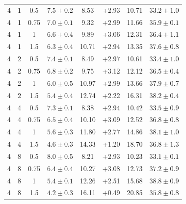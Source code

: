 \documentclass{article}
\begin{document}
\begin{table}[!htbp]
\begin{tabular}{cccccccc}
4 & 1 & 0.5 & $7.5\pm0.2$ & 8.53 & +2.93 & 10.71 & $33.2\pm1.0$\\
4 & 1 & 0.75 & $7.0\pm0.1$ & 9.32 & +2.99 & 11.66 & $35.9\pm0.1$\\
4 & 1 & 1 & $6.6\pm0.4$ & 9.89 & +3.06 & 12.31 & $36.4\pm1.1$\\
4 & 1 & 1.5 & $6.3\pm0.4$ & 10.71 & +2.94 & 13.35 & $37.6\pm0.8$\\
4 & 2 & 0.5 & $7.4\pm0.1$ & 8.49 & +2.97 & 10.61 & $33.4\pm1.0$\\
4 & 2 & 0.75 & $6.8\pm0.2$ & 9.75 & +3.12 & 12.12 & $36.5\pm0.4$\\
4 & 2 & 1 & $6.0\pm0.5$ & 10.97 & +2.99 & 13.66 & $37.9\pm0.7$\\
4 & 2 & 1.5 & $5.4\pm0.4$ & 12.74 & +2.22 & 16.31 & $38.2\pm0.4$\\
4 & 4 & 0.5 & $7.3\pm0.1$ & 8.38 & +2.94 & 10.42 & $33.5\pm0.9$\\
4 & 4 & 0.75 & $6.5\pm0.4$ & 10.10 & +3.09 & 12.52 & $36.8\pm0.8$\\
4 & 4 & 1 & $5.6\pm0.3$ & 11.80 & +2.77 & 14.86 & $38.1\pm1.0$\\
4 & 4 & 1.5 & $4.6\pm0.3$ & 14.33 & +1.20 & 18.70 & $36.8\pm1.3$\\
4 & 8 & 0.5 & $8.0\pm0.5$ & 8.21 & +2.93 & 10.23 & $33.1\pm0.1$\\
4 & 8 & 0.75 & $6.4\pm0.4$ & 10.27 & +3.08 & 12.73 & $37.2\pm0.9$\\
4 & 8 & 1 & $5.4\pm0.1$ & 12.26 & +2.51 & 15.68 & $38.8\pm0.9$\\
4 & 8 & 1.5 & $4.2\pm0.3$ & 16.11 & +0.49 & 20.85 & $35.8\pm0.8$\\
\bottomrule
\end{tabular}
\end{table}
\clearpage
\end{document}
